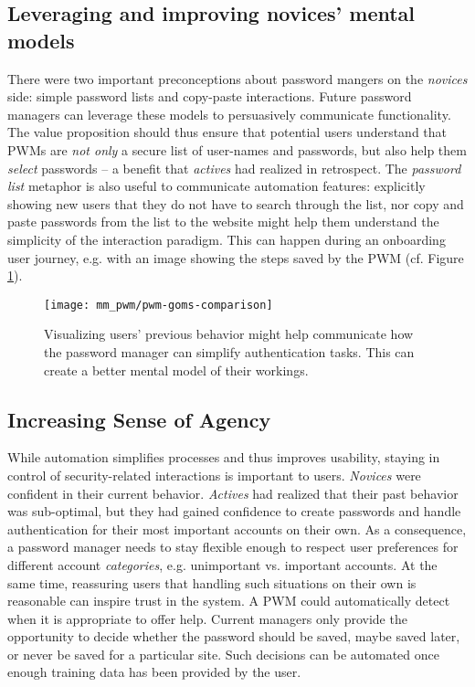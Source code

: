 \subsection{Leveraging and improving novices' mental models}
There were two important preconceptions about password mangers on the \textit{novices} side: simple password lists and copy-paste interactions. Future password managers can leverage these models to persuasively communicate functionality. The value proposition should thus ensure that potential users understand that PWMs are \textit{not only} a secure list of user-names and passwords, but also help them \textit{select} passwords -- a benefit that \textit{actives} had realized in retrospect. The \textit{password list} metaphor is also useful to communicate automation features: explicitly showing new users that they do not have to search through the list, nor copy and paste passwords from the list to the website might help them understand the simplicity of the interaction paradigm. This can happen during an onboarding user journey, e.g. with an image showing the steps saved by the PWM (cf. Figure \ref{fig:mm_pwm:pwm-goms-comparison}).

\begin{figure}%
	\centering
	\texttt{[image: mm\_pwm/pwm-goms-comparison]}
	\caption{\label{fig:mm_pwm:pwm-goms-comparison} Visualizing users' previous behavior might help communicate how the password manager can simplify authentication tasks. This can create a better mental model of their workings.}
\end{figure}


\subsection{Increasing Sense of Agency}
While automation simplifies processes and thus improves usability, staying in control of security-related interactions is important to users. \textit{Novices} were confident in their current behavior. \textit{Actives} had realized that their past behavior was sub-optimal, but they had gained confidence to create passwords and handle authentication for their most important accounts on their own. As a consequence, a password manager needs to stay flexible enough to respect user preferences for different account \textit{categories}, e.g. unimportant vs. important accounts. At the same time, reassuring users that handling such situations on their own is reasonable can inspire trust in the system. A PWM could automatically detect when it is appropriate to offer help. Current managers only provide the opportunity to decide whether the password should be saved, maybe saved later, or never be saved for a particular site. Such decisions can be automated once enough training data has been provided by the user.


